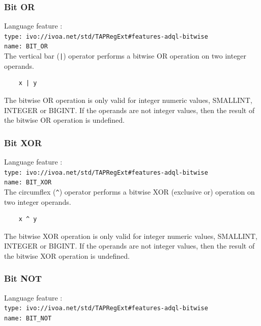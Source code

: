 \documentclass[11pt,a4paper]{ivoa}
\begin{document}
\subsubsection{Bit OR}
\label{sec:bitwise.or}
{\footnotesize Language feature :}\\
{\footnotesize \verb|type: ivo://ivoa.net/std/TAPRegExt#features-adql-bitwise|}\\
{\footnotesize \verb|name: BIT_OR|}\\

The vertical bar (\verb:|:) operator performs a bitwise OR operation
on two integer operands.

\begin{verbatim}
    x | y
\end{verbatim}

The bitwise OR operation is only valid for integer numeric values, 
SMALLINT, INTEGER or BIGINT.
If the operands are not integer values, then the result of the bitwise OR
operation is undefined.

\subsubsection{Bit XOR}
\label{sec:bitwise.xor}
{\footnotesize Language feature :}\\
{\footnotesize \verb|type: ivo://ivoa.net/std/TAPRegExt#features-adql-bitwise|}\\
{\footnotesize \verb|name: BIT_XOR|}\\

The circumflex (\verb:^:) operator performs a bitwise XOR (exclusive or)
operation on two integer operands.

\begin{verbatim}
    x ^ y
\end{verbatim}

The bitwise XOR operation is only valid for integer numeric values, 
SMALLINT, INTEGER or BIGINT.
If the operands are not integer values, then the result of the bitwise
XOR operation is undefined.

\subsubsection{Bit NOT}
\label{sec:bitwise.not}
{\footnotesize Language feature :}\\
{\footnotesize \verb|type: ivo://ivoa.net/std/TAPRegExt#features-adql-bitwise|}\\
{\footnotesize \verb|name: BIT_NOT|}\\
\end{document}
